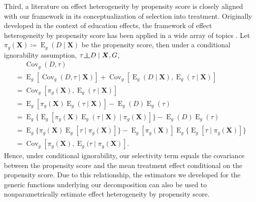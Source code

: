 \documentclass[12pt,a4paper]{article}
\newcommand{\indep}{\rotatebox[origin=c]{90}{$\models$}}  %
\newcommand{\Cov}{\operatorname{Cov}}
\newcommand{\E}{\operatorname{E}}
\def\X{{\boldsymbol X}}
\begin{document}
Third, a literature on effect heterogeneity by propensity score \citep{brand_who_2010, xie_estimating_2012, brand_uncovering_2021} is  closely aligned with our framework in its conceptualization of selection into treatment. Originally developed in the context of education effects, the framework of effect heterogeneity by propensity score has been applied in a wide array of topics \citep[e.g.,][]{brand_parental_2019, schafer_childhood_2013,choi_shadow_2016,musick_variation_2012, brand_impact_2011}. Let $\pi_g(\X) \coloneqq \E_g(D \mid \X)$ be the propensity score, then under a conditional ignorability assumption, $\tau \indep D \mid \X, G$,
\begin{align*}
&\phantom{{}={}} \Cov_g(D,\tau)  \\
&= \E_g[\Cov_g(D,\tau \mid \X)] + \Cov_g[\E_g(D \mid \X),\E_g(\tau \mid \X)] \\
&= \Cov_g[\pi_g(\X), \E_g(\tau \mid \X)] \\
&= \E_g [\pi_g(\X) \E_g(\tau \mid \X)] - \E_g(D)\E_g(\tau) \\
&= \E_g \lbrace \E_g [\pi_g(\X) \E_g(\tau \mid \X) \mid \pi_g(\X)] \rbrace - \E_g(D)\E_g(\tau) \\
&= \E_g \lbrace \pi_g(\X) \E_g[\tau \mid \pi_g(\X)] \rbrace - \E_g[\pi_g(\X)]\E_g\lbrace\E_g[\tau \mid \pi_g(\X)]\rbrace \\
&= \Cov_g [\pi_g(\X), \E_g(\tau \mid \pi_g(\X)].
\end{align*}
Hence, under conditional ignorability, our selectivity term equals the covariance between the propensity score and the mean treatment effect conditional on the propensity score. Due to this relationship, the estimators we developed for the generic functions underlying our decomposition can also be used to nonparametrically estimate effect heterogeneity by propensity score. 
\end{document}
